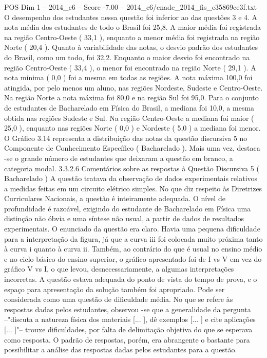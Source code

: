 \begin{textsample}{POS Dim 1 – 2014\_c6 – Score -7.00 – 2014\_c6/enade\_2014\_fis\_e35869ce3f.txt}
O desempenho dos estudantes nessa questão foi inferior ao das questões 3 e 4.
A nota média dos estudantes de todo o Brasil foi 25,8.
A maior média foi registrada na região Centro-Oeste ( 33,1 ), enquanto a menor média foi registrada na região Norte ( 20,4 ).
Quanto à variabilidade das notas, o desvio padrão dos estudantes do Brasil, como um todo, foi 32,2.
Enquanto o maior desvio foi encontrado na região Centro-Oeste ( 33,4 ), o menor foi encontrado na região Norte ( 29,1 ).
A nota mínima ( 0,0 ) foi a mesma em todas as regiões.
A nota máxima 100,0 foi atingida, por pelo menos um aluno, nas regiões Nordeste, Sudeste e Centro-Oeste.
Na região Norte a nota máxima foi 80,0 e na região Sul foi 95,0.
Para o conjunto de estudantes de Bacharelado em Física do Brasil, a mediana foi 10,0, a mesma obtida nas regiões Sudeste e Sul.
Na região Centro-Oeste a mediana foi maior ( 25,0 ), enquanto nas regiões Norte ( 0,0 ) e Nordeste ( 5,0 ) a mediana foi menor.
O Gráfico 3.14 representa a distribuição das notas da questão discursiva 5 no Componente de Conhecimento Específico ( Bacharelado ).
Mais uma vez, destaca -se o grande número de estudantes que deixaram a questão em branco, a categoria modal. 3.3.2.6 Comentários sobre as respostas à Questão Discursiva 5 ( Bacharelado ) A questão tratava da observação de dados experimentais relativos a medidas feitas em um circuito elétrico simples.
No que diz respeito às Diretrizes Curriculares Nacionais, a questão é inteiramente adequada.
O nível de profundidade é razoável, exigindo do estudante de Bacharelado em Física uma distinção não óbvia e uma síntese não usual, a partir de dados de resultados experimentais.
O enunciado da questão era claro.
Havia uma pequena dificuldade para a interpretação da figura, já que a curva iii foi colocada muito próxima tanto à curva i quanto à curva ii.
Também, ao contrário do que é usual no ensino médio e no ciclo básico do ensino superior, o gráfico apresentado foi de I vs V em vez do gráfico V vs I, o que levou, desnecessariamente, a algumas interpretações incorretas.
A questão estava adequada do ponto de vista do tempo de prova, e o espaço para apresentação da solução também foi apropriado.
Pode ser considerada como uma questão de dificuldade média.
No que se refere às respostas dadas pelos estudantes, observou -se que a generalidade da pergunta –"discuta a natureza física dos materiais [... ], dê exemplos [... ] e cite aplicações [... ]"– trouxe dificuldades, por falta de delimitação objetiva do que se esperava como resposta.
O padrão de respostas, porém, era abrangente o bastante para possibilitar a análise das respostas dadas pelos estudantes para a questão.

\end{textsample}
